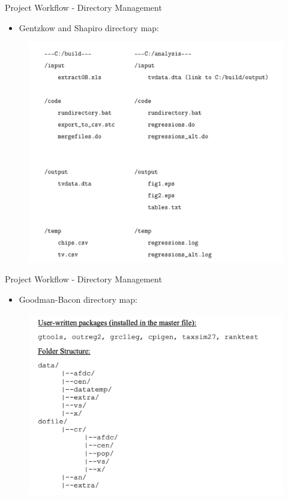 \documentclass{beamer}
\begin{document}
\begin{frame}{Project Workflow - Directory Management}
    \begin{itemize}
        \item Gentzkow and Shapiro directory map:
    \end{itemize}
    \begin{figure}
        \includegraphics[scale=0.43]{GS_directory.png}
    \end{figure}    
\end{frame}

\begin{frame}{Project Workflow - Directory Management}
    \begin{itemize}
        \item Goodman-Bacon directory map:
    \end{itemize}
    \begin{figure}
        \includegraphics[scale=0.43]{agb_directory.png}
    \end{figure}    
\end{frame}
\end{document}

